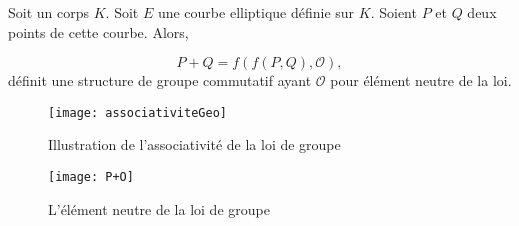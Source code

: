 \begin{theoreme}
    Soit un corps $K$. Soit $E$ une courbe elliptique définie sur $K$. Soient $P$ et $Q$ deux
    points de cette courbe. Alors, 

    \[
    P + Q = f(f(P,Q),\mathcal{O})
    ,\] 
    définit une structure de groupe commutatif ayant $\mathcal{O}$ pour élément neutre
    de la loi.
\end{theoreme}

\begin{figure}[h]
    \centering
    \texttt{[image: associativiteGeo]}
    \caption{Illustration de l'associativité de la loi de groupe}
    \label{fig:associativiteGeo}
\end{figure}

\begin{figure}[h]
    \centering
    \texttt{[image: P+O]}
    \caption{L'élément neutre de la loi de groupe}
    \label{fig:P-O}
\end{figure}

